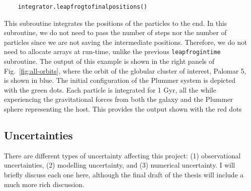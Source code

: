 \begin{lstlisting}
    integrator.leapfrogtofinalpositions()
\end{lstlisting}
This subroutine integrates the positions of the particles to the end. In this subroutine, we do not need to pass the number of steps nor the number of particles since we are not saving the intermediate positions. Therefore, we do not need to allocate arrays at run-time, unlike the previous \texttt{leapfrogintime} subroutine. The output of this example is shown in the right panels of Fig.~\ref{fig:all-orbits}, where the orbit of the globular cluster of interest, Palomar 5, is shown in blue. The initial configuration of the Plummer system is depicted with the green dots. Each particle is integrated for 1 Gyr, all the while experiencing the gravitational forces from both the galaxy and the Plummer sphere representing the host. This provides the output shown with the red dots


\subsection{Uncertainties}\label{sec:uncertainties}

There are different types of uncertainty affecting this project: (1) observational uncertainties, (2) modelling uncertainty, and (3) numerical uncertainty. I will briefly discuss each one here, although the final draft of the thesis will include a much more rich discussion. 

